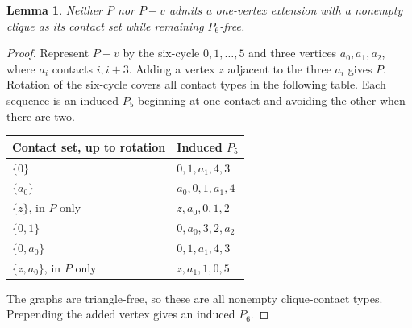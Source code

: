 \documentclass[11pt,a4paper]{article}
\newtheorem{lemma}[theorem]{Lemma}
\theoremstyle{definition}\newtheorem{definition}[theorem]{Definition}
\theoremstyle{remark}\newtheorem{remark}[theorem]{Remark}
\begin{document}
\begin{lemma}\label{local9:lem:noextension}
Neither $P$ nor $P-v$ admits a one-vertex extension with a nonempty clique
as its contact set while remaining $P_6$-free.
\end{lemma}
\begin{proof}
Represent $P-v$ by the six-cycle $0,1,\ldots,5$ and three vertices
$a_0,a_1,a_2$, where $a_i$ contacts $i,i+3$. Adding a vertex $z$ adjacent
to the three $a_i$ gives $P$. Rotation of the six-cycle covers all contact
types in the following table. Each sequence is an induced $P_5$ beginning
at one contact and avoiding the other when there are two.
\begin{center}
\begin{tabular}{ll}\toprule
Contact set, up to rotation&Induced $P_5$\\\midrule
$\{0\}$&$0,1,a_1,4,3$\\
$\{a_0\}$&$a_0,0,1,a_1,4$\\
$\{z\}$, in $P$ only&$z,a_0,0,1,2$\\
$\{0,1\}$&$0,a_0,3,2,a_2$\\
$\{0,a_0\}$&$0,1,a_1,4,3$\\
$\{z,a_0\}$, in $P$ only&$z,a_1,1,0,5$\\\bottomrule
\end{tabular}
\end{center}
The graphs are triangle-free, so these are all nonempty clique-contact
types. Prepending the added vertex gives an induced $P_6$.
\end{proof}
\end{document}
